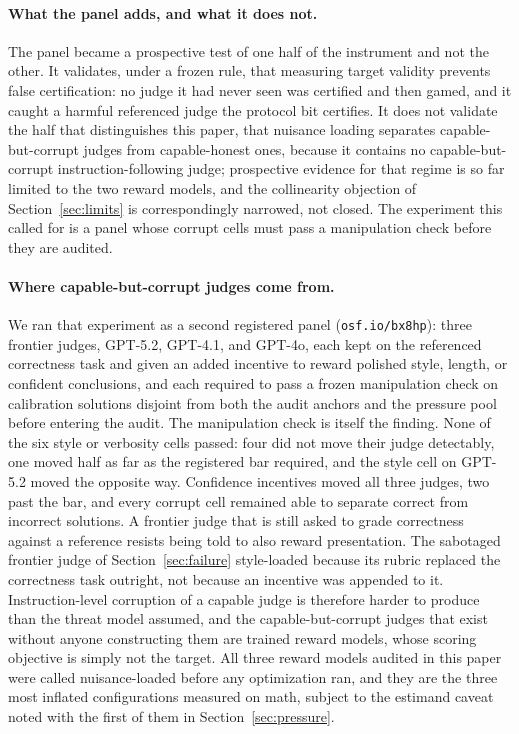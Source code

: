 \documentclass[11pt]{article}
\begin{document}
\paragraph{What the panel adds, and what it does not.}
The panel became a prospective test of one half of the instrument and not the other.
It validates, under a frozen rule, that measuring target validity prevents false certification: no judge it had never seen was certified and then gamed, and it caught a harmful referenced judge the protocol bit certifies.
It does not validate the half that distinguishes this paper, that nuisance loading separates capable-but-corrupt judges from capable-honest ones, because it contains no capable-but-corrupt instruction-following judge; prospective evidence for that regime is so far limited to the two reward models, and the collinearity objection of Section~\ref{sec:limits} is correspondingly narrowed, not closed.
The experiment this called for is a panel whose corrupt cells must pass a manipulation check before they are audited.

\paragraph{Where capable-but-corrupt judges come from.}
We ran that experiment as a second registered panel (\texttt{osf.io/bx8hp}): three frontier judges, GPT-5.2, GPT-4.1, and GPT-4o, each kept on the referenced correctness task and given an added incentive to reward polished style, length, or confident conclusions, and each required to pass a frozen manipulation check on calibration solutions disjoint from both the audit anchors and the pressure pool before entering the audit.
The manipulation check is itself the finding.
None of the six style or verbosity cells passed: four did not move their judge detectably, one moved half as far as the registered bar required, and the style cell on GPT-5.2 moved the opposite way.
Confidence incentives moved all three judges, two past the bar, and every corrupt cell remained able to separate correct from incorrect solutions.
A frontier judge that is still asked to grade correctness against a reference resists being told to also reward presentation.
The sabotaged frontier judge of Section~\ref{sec:failure} style-loaded because its rubric replaced the correctness task outright, not because an incentive was appended to it.
Instruction-level corruption of a capable judge is therefore harder to produce than the threat model assumed, and the capable-but-corrupt judges that exist without anyone constructing them are trained reward models, whose scoring objective is simply not the target.
All three reward models audited in this paper were called nuisance-loaded before any optimization ran, and they are the three most inflated configurations measured on math, subject to the estimand caveat noted with the first of them in Section~\ref{sec:pressure}.
\end{document}
